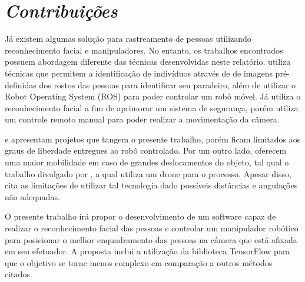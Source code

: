 \section{\textit{Contribuições}}\label{sec:Cap2_Contribuicoes}

Já existem algumas solução para rastreamento de pessoas utilizando reconhecimento facial e manipuladores. No entanto, os trabalhos encontrados possuem abordagem diferente das técnicas desenvolvidas neste relatório. \cite{koide2017people} utiliza técnicas que permitem a identificação de indivíduos através de de imagens pré-definidas dos rostos das pessoas para identificar seu paradeiro, além de utilizar o Robot Operating System (ROS) para poder controlar um robô móvel. Já\cite{liu2005ibotguard} utiliza o reconhecimento facial a fim de aprimorar um sistema de segurança, porém utiliza um controle remoto manual para poder realizar a movimentação da câmera.

\cite{suzuki2009human} e \cite{song2004face} apresentam projetos que tangem o presente trabalho, porém ficam limitados aos graus de liberdade entregues ao robô controlado. Por um outro lado, oferecem uma maior mobilidade em caso de grandes deslocamentos do objeto, tal qual o trabalho divulgado por \cite{shanthi2021smart}, a qual utiliza um drone para o processo. Apesar disso, \cite{hsu2015face} cita as limitações de utilizar tal tecnologia dado possíveis distâncias e angulações não adequadas.

O presente trabalho irá propor o desenvolvimento de um software capaz de realizar o reconhecimento facial das pessoas e controlar um manipulador robótico para posicionar o melhor enquadramento das pessoas na câmera que está afixada em seu efetuador. A proposta inclui a utilização da biblioteca TensorFlow para que o objetivo se torne menos complexo em comparação a outros métodos citados.


